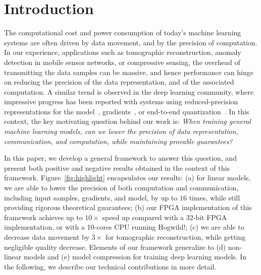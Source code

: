 \documentclass{article}
\begin{document}
\section{Introduction}

The computational cost and power consumption of today's machine learning systems are often driven by data movement, and by the precision of computation. 
In our experience, applications such as tomographic reconstruction, anomaly detection in mobile sensor networks, or compressive sensing, the overhead of transmitting the data samples can be massive, 
and hence performance can hinge on reducing the precision of the data representation, and of the associated computation. 
A similar trend is observed in the deep learning community, where impressive progress has been reported with systems using reduced-precision representations for the model~\cite{m1, m2}, gradients~\cite{zzz}, 
or end-to-end quantization~\cite{m1, m2}. 
In this context, the key motivating question behind our work is:  
{\em When training general machine learning models,
can we lower the precision of data representation,
communication, and computation, while maintaining provable guarantees?}
 
% 
%

In this paper, we develop a general 
framework to answer this question, and
present both  positive and negative results
 obtained in the context of this framework. 
 Figure~\ref{fig:highlight} encapsulates our results: 
(a) for linear models, we are able to lower the precision of both computation and communication, including input samples, gradients, and model, by up to $16$ times, while still providing rigorous theoretical guarantees; 
(b) our FPGA implementation of this framework achieves up to $10\times$ speed up compared with
a 32-bit FPGA implementation, or with a 10-cores CPU running Hogwild!;  
(c) we are able to decrease data movement by $3\times$ for
tomographic reconstruction, while getting negligible quality decrease. 
Elements of our framework generalize to (d) non-linear models and  (e) model compression for training deep learning models. 
In the following, we describe our technical contributions in more detail. 
\end{document}
